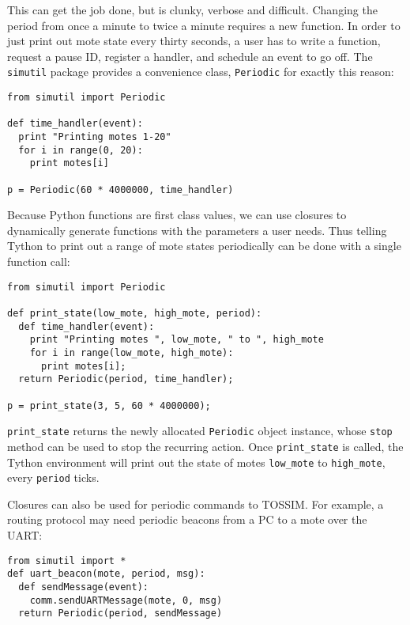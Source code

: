 \documentclass[10pt]{article}
\newcommand{\name}{{Tython}\xspace}
\begin{document}
This can get the job done, but is clunky, verbose and difficult.
Changing the period from once a minute to twice a minute requires a
new function. In order to just print out mote state every thirty
seconds, a user has to write a function, request a pause ID, register
a handler, and schedule an event to go off. The {\tt simutil} package
provides a convenience class, {\tt Periodic} for exactly this reason:

\begin{verbatim}
from simutil import Periodic

def time_handler(event):
  print "Printing motes 1-20"
  for i in range(0, 20):
    print motes[i]

p = Periodic(60 * 4000000, time_handler)

\end{verbatim}

Because Python functions are first class values, we can use closures
to dynamically generate functions with the parameters a user needs.
Thus telling \name to print out a range of mote states periodically
can be done with a single function call:

\begin{verbatim}
from simutil import Periodic

def print_state(low_mote, high_mote, period):
  def time_handler(event):
    print "Printing motes ", low_mote, " to ", high_mote
    for i in range(low_mote, high_mote):
      print motes[i];
  return Periodic(period, time_handler);

p = print_state(3, 5, 60 * 4000000);

\end{verbatim}

{\tt print\_state} returns the newly allocated {\tt Periodic} object
instance, whose {\tt stop} method can be used to stop the recurring
action. Once {\tt print\_state} is called, the \name environment will
print out the state of motes {\tt low\_mote} to {\tt high\_mote},
every {\tt period} ticks.

Closures can also be used for periodic commands to TOSSIM. For
example, a routing protocol may need periodic beacons from a PC to a
mote over the UART:

\begin{verbatim}
from simutil import *
def uart_beacon(mote, period, msg):
  def sendMessage(event):
    comm.sendUARTMessage(mote, 0, msg)
  return Periodic(period, sendMessage)
\end{verbatim}
\end{document}
